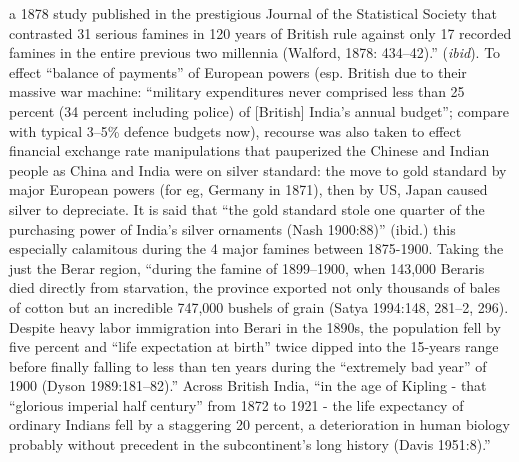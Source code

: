 a 1878 study published in the prestigious Journal of the Statistical Society that contrasted 31 serious famines in 120 years of British rule against only 17 recorded famines in the entire previous two millennia (Walford, 1878: 434–42).” ({\sl ibid}). To effect “balance of payments” of European powers (esp. British due to their massive war machine: “military expenditures never comprised less than 25 percent (34 percent including police) of [British] India’s annual budget”; compare with typical 3--5\% defence budgets now), recourse was also taken to effect financial exchange rate manipulations that pauperized the Chinese and Indian people as China and India were on silver standard: the move to gold standard by major European powers (for eg, Germany in 1871), then by US, Japan caused silver to depreciate. It is said that “the gold standard stole one quarter of the purchasing power of India’s silver ornaments (Nash 1900:88)” (ibid.) this especially calamitous during the 4 major famines between 1875-1900. Taking the just the Berar region, “during the famine of 1899–1900, when 143,000 Beraris died directly from starvation, the province exported not only thousands of bales of cotton but an incredible 747,000 bushels of grain (Satya 1994:148, 281–2, 296). Despite heavy labor immigration into Berari in the 1890s, the population fell by five percent and “life expectation at birth” twice dipped into the 15-years range before finally falling to less than ten years during the “extremely bad year” of 1900 (Dyson 1989:181–82).” Across British India, “in the age of Kipling - that “glorious imperial half century” from 1872 to 1921 - the life expectancy of ordinary Indians fell by a staggering 20 percent, a deterioration in human biology probably without precedent in the subcontinent’s long history (Davis 1951:8).” 

